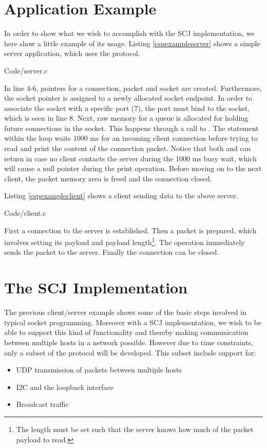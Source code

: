 \section{Application Example}
In order to show what we wish to accomplish with the SCJ implementation, we here show a little example of its usage. Listing \ref{cspexampleserver} shows a simple server application, which uses the protocol. 


{Code/server.c}

In line 4-6, pointers for a connection, packet and socket are created. Furthermore, the socket pointer is assigned to a newly allocated socket endpoint. In order to associate the socket with a specific port (7), the port must bind to the socket, which is seen in line 8. Next, raw memory for a queue is allocated for holding future connections in the socket. This happens through a call to . The  statement within the loop waits 1000 ms for an incoming client connection before trying to read and print the content of the connection packet. Notice that both  and  can return  in case no client contacts the server during the 1000 ms busy wait, which will cause a null pointer during the print operation. Before moving on to the next client, the packet memory area is freed and the connection closed. 

Listing \ref{cspexampleclient} shows a client sending data to the above server.


{Code/client.c}

First a connection to the server is established. Then a packet is prepared, which involves setting its payload and payload length\footnote{The length must be set such that the server knows how much of the packet payload to read.}. The  operation immediately sends the packet to the server. Finally the connection can be closed.

\section{The SCJ Implementation}
The previous client/server example shows some of the basic steps involved in typical socket programming. Moreover with a SCJ implementation, we wish to be able to support this kind of functionality and thereby making communication between multiple hosts in a network possible. However due to time constraints, only a subset of the protocol will be developed. This subset include support for:

\begin{itemize}
	\item UDP transmission of packets between multiple hosts
	\item I2C and the loopback interface
	\item Broadcast traffic
\end{itemize}
